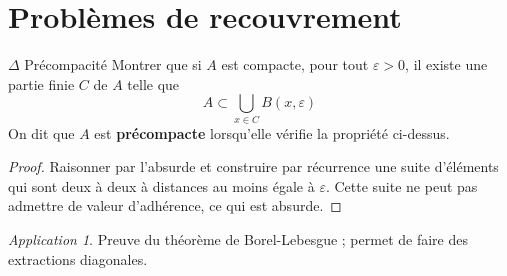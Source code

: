 \documentclass[french,a4paper]{article}
\theoremstyle{plain}
\theoremstyle{definition}
\theoremstyle{remark}
\newtheorem*{app}{Application}
\begin{document}
\section{Problèmes de recouvrement}

\begin{ex}[Moulin.31]{$\Delta$ Précompacité} Montrer que si $A$ est compacte, pour tout $\varepsilon>0$, il existe une partie finie $C$ de $A$ telle que $$A\subset\bigcup_{x\in C}B(x,\varepsilon)$$ On dit que $A$ est \textbf{précompacte} lorsqu'elle vérifie la propriété ci-dessus.
\end{ex}
\begin{proof}
	Raisonner par l'absurde et construire par récurrence une suite d'éléments qui sont deux à deux à distances au moins égale à $\varepsilon$. Cette suite ne peut pas admettre de valeur d'adhérence, ce qui est absurde.
\end{proof}
\begin{app}
	Preuve du théorème de Borel-Lebesgue ; permet de faire des extractions diagonales.
\end{app}
\end{document}
